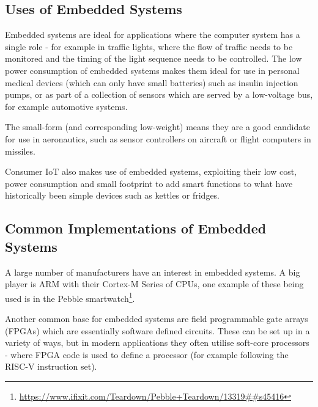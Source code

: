 \subsection{Uses of Embedded Systems}\label{usesEmbeddedSystems}

Embedded systems are ideal for applications where the computer system has a single role - for example in traffic lights, where the flow of traffic needs to be monitored and the timing of the light sequence needs to be controlled. The low power consumption of embedded systems makes them ideal for use in personal medical devices (which can only have small batteries) such as insulin injection pumps, or as part of a collection of sensors which are served by a low-voltage bus, for example automotive systems.

The small-form (and corresponding low-weight) means they are a good candidate for use in aeronautics, such as sensor controllers on aircraft or flight computers in missiles.

Consumer IoT also makes use of embedded systems, exploiting their low cost, power consumption and small footprint to add smart functions to what have historically been simple devices such as kettles or fridges.

\subsection{Common Implementations of Embedded Systems}\label{implementationsEmbeddedSystems}
A large number of manufacturers have an interest in embedded systems. A big player is ARM with their Cortex-M Series of CPUs, one example of these being used is in the Pebble smartwatch\footnote{\url{https://www.ifixit.com/Teardown/Pebble+Teardown/13319##s45416}}.

Another common base for embedded systems are field programmable gate arrays (FPGAs) which are essentially software defined circuits. These can be set up in a variety of ways, but in modern applications they often utilise soft-core processors - where FPGA code is used to define a processor (for example following the RISC-V instruction set).

